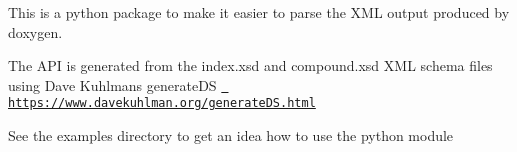 This is a python package to make it easier to parse the XML output produced by doxygen.

The API is generated from the index.\+xsd and compound.\+xsd XML schema files using Dave Kuhlman\textquotesingle{}s generate\+DS \href{https://www.davekuhlman.org/generateDS.html}{\texttt{ https\+://www.\+davekuhlman.\+org/generate\+DS.\+html}}

See the examples directory to get an idea how to use the python module 